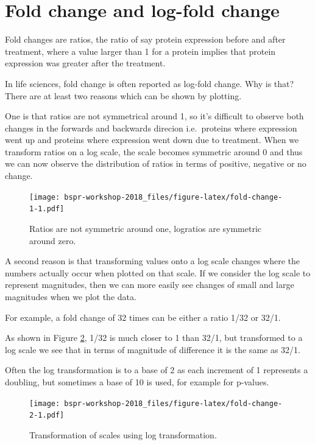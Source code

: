\documentclass[12pt,]{book}
\theoremstyle{definition}
\theoremstyle{definition}
\theoremstyle{definition}
\theoremstyle{remark}
\begin{document}
\section{Fold change and log-fold
change}\label{fold-change-and-log-fold-change}

Fold changes are ratios, the ratio of say protein expression before and
after treatment, where a value larger than 1 for a protein implies that
protein expression was greater after the treatment.

In life sciences, fold change is often reported as log-fold change. Why
is that? There are at least two reasons which can be shown by plotting.

One is that ratios are not symmetrical around 1, so it's difficult to
observe both changes in the forwards and backwards direcion
i.e.~proteins where expression went up and proteins where expression
went down due to treatment. When we transform ratios on a log scale, the
scale becomes symmetric around 0 and thus we can now observe the
distribution of ratios in terms of positive, negative or no change.




\begin{figure}
\centering
\texttt{[image: bspr-workshop-2018\_files/figure-latex/fold-change-1-1.pdf]}
\caption{\label{fig:fold-change-1}Ratios are not symmetric around one, logratios are
symmetric around zero.}
\end{figure}

A second reason is that transforming values onto a log scale changes
where the numbers actually occur when plotted on that scale. If we
consider the log scale to represent magnitudes, then we can more easily
see changes of small and large magnitudes when we plot the data.

For example, a fold change of 32 times can be either a ratio 1/32 or
32/1.

As shown in Figure \ref{fig:fold-change-2}, 1/32 is much closer to 1
than 32/1, but transformed to a log scale we see that in terms of
magnitude of difference it is the same as 32/1.

Often the log transformation is to a base of 2 as each increment of 1
represents a doubling, but sometimes a base of 10 is used, for example
for p-values.



\begin{figure}
\centering
\texttt{[image: bspr-workshop-2018\_files/figure-latex/fold-change-2-1.pdf]}
\caption{\label{fig:fold-change-2}Transformation of scales using log transformation.}
\end{figure}
\end{document}
